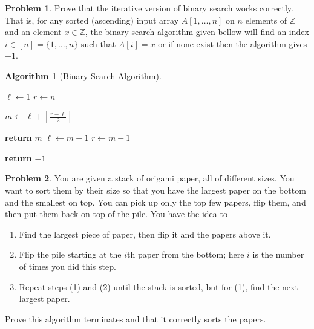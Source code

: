 \documentclass{article}
\theoremstyle{plain}
\theoremstyle{definition}
\newtheorem{problem}{Problem}[section]
\newtheorem*{algorithm*}{Algorithm}\newtheorem{manualprobleminner}{Problem}
\newcommand{\Z}{\mathbb Z}
\begin{document}
\begin{problem}\label{prob_bin_search_li}
    Prove that the iterative version of binary search works correctly. That is, for any sorted (ascending) input array \(A[1,\dotsc, n]\) on \(n\) elements of \(\Z\) and an element \(x \in \Z\), the binary search algorithm given bellow will find an index \(i \in [n] = \{1, \dotsc, n\}\) such that \(A[i] = x\) or if none exist then the algorithm gives \(-1\).

    \begin{algorithm*}[Binary Search Algorithm] \phantom{}%
        \begin{center}
        \begin{minipage}{.5\linewidth}
        \begin{algorithmic}[1]
                \State \(\ell \leftarrow 1\)
                \State \(r \leftarrow n\)
    
                    \State \(m \leftarrow \ell + \left\lfloor\frac{r - \ell}{2}\right\rfloor\)
        
                        \State \textbf{return} \(m\)
                        \State \(\ell \leftarrow m + 1\)
                    \Else
                        \State \(r \leftarrow m - 1\)
                    \EndIf
                        
                \EndWhile	
                   
                \State \textbf{return} \(-1\)
            \EndProcedure
        \end{algorithmic}
        \end{minipage}
        \end{center}
        \end{algorithm*}
\end{problem}

\begin{problem}
    You are given a stack of origami paper, all of different sizes. You want to sort them by their size so that you have the largest paper on the bottom and the smallest on top. You can pick up only the top few papers, flip them, and then put them back on top of the pile. You have the idea to
    \begin{enumerate}
        \item Find the largest piece of paper, then flip it and the papers above it.
        \item Flip the pile starting at the \(i\)th paper from the bottom; here \(i\) is the number of times you did this step.
        \item Repeat steps (1) and (2) until the stack is sorted, but for (1), find the next largest paper.
    \end{enumerate}
    Prove this algorithm terminates and that it correctly sorts the papers.
\end{problem}
\end{document}
